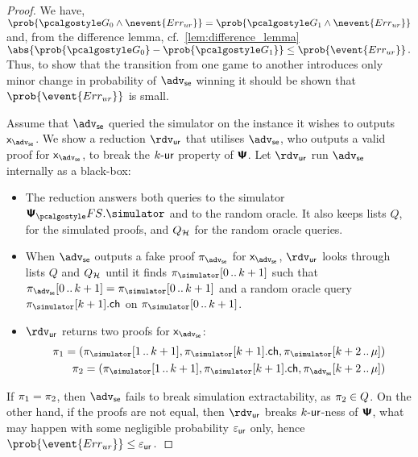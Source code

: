 \let\accentvec\vec \documentclass[runningheads]{llncs}
\begin{document}
\begin{proof}
   We have, \( \prob{\game{0} \land
    \nevent{\errur}} = \prob{\game{1} \land \nevent{\errur}} \) and, from the
  difference lemma, cf.~\cref{lem:difference_lemma} \( \abs{\prob{\game{0}} -
    \prob{\game{1}}} \leq \prob{\event{\errur}}\,. \) Thus, to show that the
  transition from one game to another introduces only minor change in
  probability of $\advse$ winning it should be shown that
  $\prob{\event{\errur}}$ is small.

  Assume that $\advse$ queried the simulator on the instance it wishes to
  outputs $\inp_{\advse}$. We show a reduction $\rdvur$ that utilises $\advse$,
  who outputs a valid proof for $\inp_\advse$, to break the ${k\text{-}\mathsf{ur}}$ property of
  $\bm{\mathsf{\Psi}}$. Let $\rdvur$ run $\advse$ internally as a black-box:
\begin{itemize}
	\item The reduction answers both queries to the simulator $\psfs.\simulator$ and to the random oracle. 
	It also keeps lists $Q$, for the simulated proofs, and $Q_{\mathcal{H}}$ for the random oracle queries. 
\item When $\advse$ outputs a fake proof $\zkproof_{\advse}$ for $\inp_\advse$,
  $\rdvur$ looks through lists $Q$ and $Q_{\mathcal{H}}$ until it finds
  $\zkproof_{\simulator}\range{0}{k + 1}$ such that
  $\zkproof_{\advse}\range{0}{k + 1} = \zkproof_{\simulator}\range{0}{k + 1}$
  and a random oracle query $\zkproof_{\simulator}[k + 1].\ch$ on
  $\zkproof_{\simulator}\range{0}{k + 1}$.
	\item $\rdvur$ returns two proofs for $\inp_\advse$:
	\begin{align*}
		\zkproof_1 = (\zkproof_{\simulator}\range{1}{k + 1},
		\zkproof_{\simulator}[k + 1].\ch, \zkproof_{\simulator}\range{k +
		2}{\mu})\\
		\zkproof_2 = (\zkproof_{\simulator}\range{1}{k + 1},
		\zkproof_{\simulator}[k + 1].\ch, \zkproof_{\advse}\range{k + 2}{\mu})
	\end{align*}
	\end{itemize}  
	If $\pi_1 = \pi_2$, then $\advse$ fails to break simulation
  extractability, as $\pi_2 \in Q$. On the other hand, if the proofs are
  not equal, then $\rdvur$ breaks ${k\text{-}\mathsf{ur}}$-ness of $\bm{\mathsf{\Psi}}$, what may happen with
  some negligible probability $\varepsilon_{\mathsf{ur}}$ only, hence \( \prob{\event{\errur}} \leq
  \epsur\,. \)
	

\end{proof}
\end{document}
